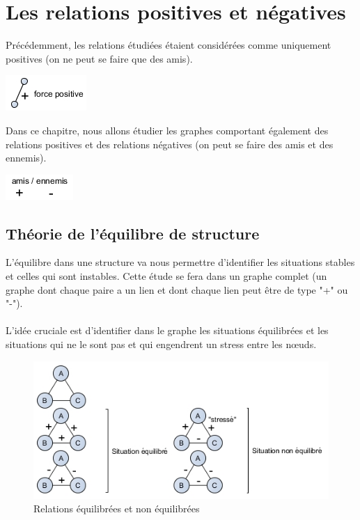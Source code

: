 \section{Les relations positives et négatives}

Précédemment, les relations étudiées étaient considérées comme uniquement positives (on ne peut se faire que des amis). 

\includegraphics[scale=1]{images/22_force-positive}

Dans ce chapitre, nous allons étudier les graphes comportant également des relations positives et des relations négatives (on peut se faire des amis et des ennemis).

\includegraphics[scale=1]{images/22_amis-ennemis3.png}

\subsection{Théorie de l'équilibre de structure}
L'équilibre dans une structure va nous permettre d'identifier les situations stables et celles qui sont instables. Cette étude se fera dans un graphe complet (un graphe dont chaque paire a un lien et dont chaque lien peut être de type "+" ou "-").

\paragraph{}
L'idée cruciale est d'identifier dans le graphe les situations équilibrées et les situations qui ne le sont pas et qui engendrent un stress entre les nœuds.  

\begin{figure}[h!]
\label{equi}
\caption{Relations équilibrées et non équilibrées}
\centering
\includegraphics[width=\textwidth]{images/22_situation.png}
\end{figure}


